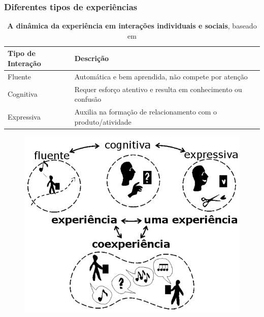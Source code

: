 \expandafter\documentclass\expandafter[table, usenames, svgnames, dvipsnames, \classopts]{beamer}
\begin{document}
\begin{frame}
	\frametitle{\textbf{Diferentes tipos de experiências}}

	\begin{table}
		\tiny
		\setlength{\tabcolsep}{5pt}
		\renewcommand{\arraystretch}{1}
		\caption{\textbf{A dinâmica da experiência em interações individuais e sociais}, baseado em \cite{Forlizzi2004}}
		\begin{tabular}{ll}
			\toprule
			\textbf{Tipo de Interação} & \textbf{Descrição}\\
			\midrule
			Fluente & Automática e bem aprendida, não compete por atenção\\
			Cognitiva & Requer esforço atentivo e resulta em conhecimento ou confusão\\
			Expressiva & Auxilia na formação de relacionamento com o produto/atividade\\
			\bottomrule
		\end{tabular}
	\end{table}

	\vspace{-1em}

 	\begin{figure}
	    \centering
        \includegraphics[height=0.5\paperheight]{experience-dynamics}
    \end{figure}
    
	\vspace{-1em}
	    

\end{frame}
\end{document}
